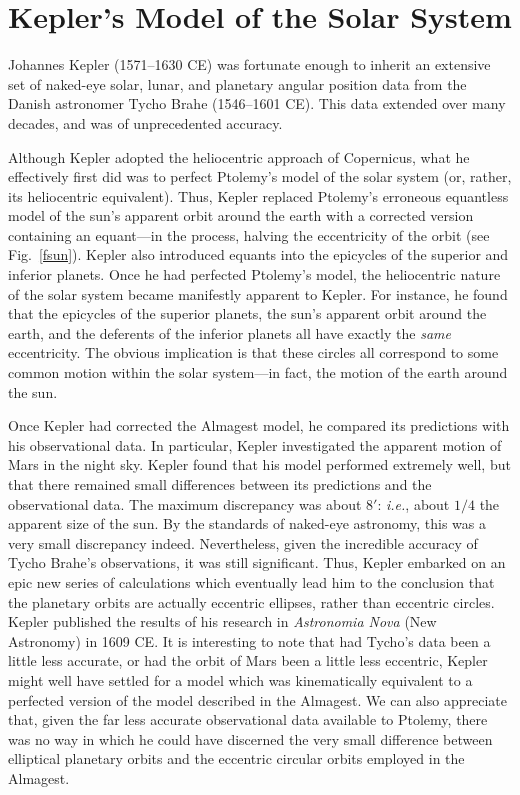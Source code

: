 \section{Kepler's Model of the Solar System}
Johannes Kepler (1571--1630 CE) was fortunate enough to inherit an extensive set of naked-eye solar, lunar, and planetary angular position data
 from the Danish astronomer Tycho Brahe (1546--1601 CE). This data
 extended over many decades, and was of unprecedented accuracy.
 
 Although Kepler adopted the heliocentric approach of Copernicus,
 what he effectively first did was to  perfect Ptolemy's model of the solar system (or, rather,
 its heliocentric equivalent). Thus, Kepler replaced Ptolemy's
 erroneous equantless model of the sun's apparent orbit around the
 earth with a corrected version containing an equant---in the process,
 halving the eccentricity of the orbit (see Fig.~\ref{fsun}). Kepler also introduced equants
 into the epicycles of the superior and inferior planets. Once he had perfected Ptolemy's model, the heliocentric nature of
 the solar system became manifestly apparent to Kepler. For instance,
 he found that the epicycles of the superior planets, the sun's
 apparent orbit around the earth, and the deferents of the inferior
 planets all have exactly the {\em same}\/ eccentricity. The obvious implication
  is that these circles all correspond to some common motion within the
 solar system---in fact, the motion of the earth around the sun.
 
 Once Kepler had corrected the Almagest model, he compared its predictions
 with his observational data. In particular, Kepler investigated 
 the apparent motion of Mars in the night sky. Kepler found that his  model performed extremely well,
 but that there remained small differences between its predictions and the observational data. The maximum discrepancy was about $8'$: {\em i.e.}, about $1/4$ the apparent size of the
 sun. By the standards of naked-eye astronomy, this was a very small discrepancy indeed. Nevertheless, given the incredible accuracy of Tycho Brahe's
 observations, it was still significant. Thus, Kepler embarked on an epic new series
 of calculations which eventually lead him to the conclusion that the
 planetary orbits are actually eccentric ellipses, rather than eccentric circles. 
 Kepler published the results of his research in {\em Astronomia
 Nova} (New Astronomy) in 1609 CE.
 It is
 interesting to note that had Tycho's data been a little less accurate,
 or had the orbit of Mars been a little less eccentric, Kepler might well 
 have settled for a model which was kinematically equivalent to
 a perfected version of the model described in the Almagest. We can also
 appreciate that, given the far less accurate observational data available to
 Ptolemy, there was no way in which he could have discerned the
 very small difference between elliptical planetary orbits and the eccentric
 circular orbits employed in the Almagest.
 
